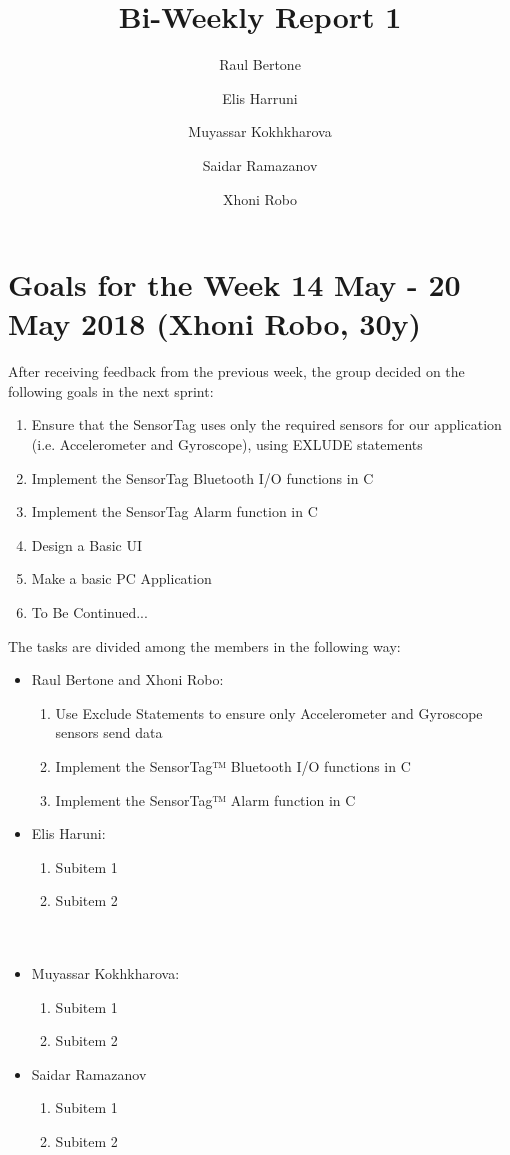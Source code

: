\documentclass[]{article}
\title{Bi-Weekly Report 1}
\author{
	Raul Bertone
	\and
	Elis Harruni
	\and
	Muyassar Kokhkharova
	\and
	Saidar Ramazanov
	\and
	Xhoni Robo	
}
\begin{document}
\maketitle

\section{Goals for the Week 14 May - 20 May 2018  (Xhoni Robo, 30y)}
After receiving feedback from the previous week, the group decided on the following goals in the next sprint:
\begin{enumerate}
	\item Ensure that the SensorTag uses only the required sensors for our application (i.e. Accelerometer and Gyroscope), using EXLUDE statements
	\item Implement the SensorTag Bluetooth I/O functions in C
	\item Implement the SensorTag Alarm function in C
	\item Design a Basic UI
	\item Make a basic PC Application
	\item To Be Continued...
\end{enumerate}
The tasks are divided among the members in the following way:
\begin{itemize}
	\item Raul Bertone and Xhoni Robo:
	\begin{enumerate}
		\item Use Exclude Statements to ensure only Accelerometer and Gyroscope sensors send data
		\item Implement the SensorTag™ Bluetooth I/O functions in C
		\item Implement the SensorTag™ Alarm function in C
	\end{enumerate}
	\item Elis Haruni:
	\begin{enumerate}
		\item Subitem 1
		\item Subitem 2\\\\\\
	\end{enumerate}
	\item Muyassar Kokhkharova:
	\begin{enumerate}
		\item Subitem 1
		\item Subitem 2
	\end{enumerate}
	\item Saidar Ramazanov
	\begin{enumerate}
		\item Subitem 1
		\item Subitem 2
	\end{enumerate}
\end{itemize}
\end{document}
